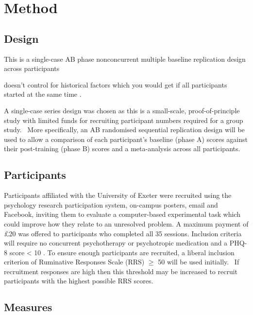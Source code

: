 \documentclass[man,a4paper,biblatex]{apa6}
\begin{document}
\section{Method}

\subsection{Design}

This is a single-case AB phase nonconcurrent multiple baseline
replication design across participants \parencite{bulte_when_2012}
\parencite{onghena_customization_2005}

doesn't control for historical factors which you
would get if all participants started at the same time
\parencite{watson_non-concurrent_1981}.


A single-case series design was chosen as this is a small-scale,
proof-of-principle study with limited funds for recruiting participant
numbers required for a group study. \ More specifically, an AB randomised
sequential replication design \parencite{onghena_customization_2005} will
be used to allow a comparison of each participant's baseline (phase A)
scores against their post-training (phase B) scores and a meta-analysis
across all participants.

\subsection{Participants}

Participants affiliated with the University of Exeter were recruited using
the psychology research participation system, on-campus posters, email
and Facebook,  inviting them to evaluate a computer-based experimental
task which could improve how they relate to an unresolved problem.
A maximum payment of {\pounds}20 was offered to participants who
completed all 35 sessions.  Inclusion criteria will require no concurrent
psychotherapy or psychotropic medication and a PHQ-8 score {\textless}
10 \parencite{kroenke_phq-8_2009}.  To ensure enough participants are
recruited, a liberal inclusion criterion of Ruminative Responses Scale
(RRS) ${\geq}$ 50 \parencite{treynor_rumination_2003} will be used
initially. \ If recruitment responses are high then this threshold may
be increased to recruit participants with the highest possible RRS scores.

\subsection{Measures}
\end{document}
